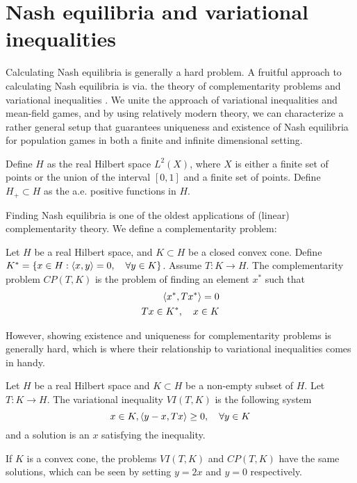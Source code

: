 \section*{Nash equilibria and variational inequalities}
Calculating Nash equilibria is generally a hard problem. A fruitful approach to calculating Nash equilibria is via. the theory of complementarity problems and variational inequalities \citep{karamardian complementarity articles variational}. We unite the approach of variational inequalities and mean-field games, and by using relatively modern theory, we can characterize a rather general setup that guarantees uniqueness and existence of Nash equilibria for population games in both a finite and infinite dimensional setting.
\begin{definition}
  Define $H$ as the real Hilbert space $L^2(X)$, where $X$ is either a finite set of points or the union of the interval $[0,1]$ and a finite set of points. Define $H_+ \subset H$ as the a.e. positive functions in $H$.
\end{definition}
Finding Nash equilibria is one of the oldest applications of (linear) complementarity theory. We define a complementarity problem:
\begin{definition}
  Let $H$ be a real Hilbert space, and $K \subset H$ be a closed convex cone. Define $K^* = \{ x \in H : \left \langle x,y \right \rangle = 0, \quad \forall y\in K\} $. Assume $T:K \to H$. The complementarity problem $CP(T,K)$ is the problem of finding an element $x^*$ such that
  \begin{equation}
    \begin{split}
    \left \langle x^*,Tx^* \right \rangle = 0 \\
    Tx \in K^*, \quad  x\in K
  \end{split}
  \end{equation}
\end{definition}
However, showing existence and uniqueness for complementarity problems is generally hard, which is where their relationship to variational inequalities comes in handy.
\begin{definition}
  Let $H$ be a real Hilbert space and $K\subset H$ be a non-empty subset of $H$. Let $T: K \to H$. The variational inequality $VI(T,K)$ is the following system
  \begin{equation}
    x \in K, \left \langle y-x,Tx \right \rangle \geq 0, \quad \forall y \in K
  \end{equation}
  and a solution is an $x$ satisfying the inequality.
\end{definition}
If $K$ is a convex cone, the problems $VI(T,K)$ and $CP(T,K)$ have the same solutions, which can be seen by setting $y=2x$ and $y=0$ respectively.

